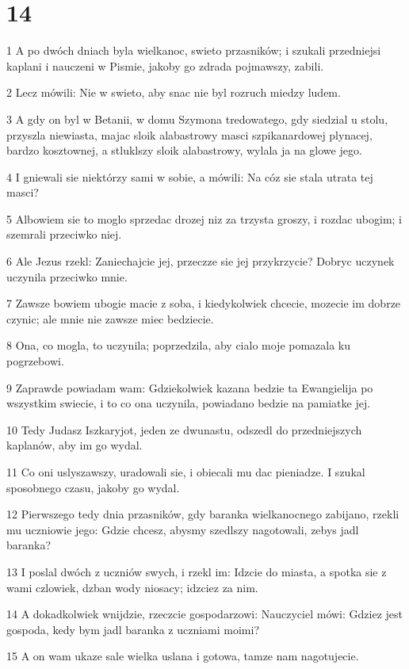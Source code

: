 \chapter{14}

\par 1 A po dwóch dniach byla wielkanoc, swieto przasników; i szukali przedniejsi kaplani i nauczeni w Pismie, jakoby go zdrada pojmawszy, zabili.
\par 2 Lecz mówili: Nie w swieto, aby snac nie byl rozruch miedzy ludem.
\par 3 A gdy on byl w Betanii, w domu Szymona tredowatego, gdy siedzial u stolu, przyszla niewiasta, majac sloik alabastrowy masci szpikanardowej plynacej, bardzo kosztownej, a stluklszy sloik alabastrowy, wylala ja na glowe jego.
\par 4 I gniewali sie niektórzy sami w sobie, a mówili: Na cóz sie stala utrata tej masci?
\par 5 Albowiem sie to moglo sprzedac drozej niz za trzysta groszy, i rozdac ubogim; i szemrali przeciwko niej.
\par 6 Ale Jezus rzekl: Zaniechajcie jej, przeczze sie jej przykrzycie? Dobryc uczynek uczynila przeciwko mnie.
\par 7 Zawsze bowiem ubogie macie z soba, i kiedykolwiek chcecie, mozecie im dobrze czynic; ale mnie nie zawsze miec bedziecie.
\par 8 Ona, co mogla, to uczynila; poprzedzila, aby cialo moje pomazala ku pogrzebowi.
\par 9 Zaprawde powiadam wam: Gdziekolwiek kazana bedzie ta Ewangielija po wszystkim swiecie, i to co ona uczynila, powiadano bedzie na pamiatke jej.
\par 10 Tedy Judasz Iszkaryjot, jeden ze dwunastu, odszedl do przedniejszych kaplanów, aby im go wydal.
\par 11 Co oni uslyszawszy, uradowali sie, i obiecali mu dac pieniadze. I szukal sposobnego czasu, jakoby go wydal.
\par 12 Pierwszego tedy dnia przasników, gdy baranka wielkanocnego zabijano, rzekli mu uczniowie jego: Gdzie chcesz, abysmy szedlszy nagotowali, zebys jadl baranka?
\par 13 I poslal dwóch z uczniów swych, i rzekl im: Idzcie do miasta, a spotka sie z wami czlowiek, dzban wody niosacy; idzciez za nim.
\par 14 A dokadkolwiek wnijdzie, rzeczcie gospodarzowi: Nauczyciel mówi: Gdziez jest gospoda, kedy bym jadl baranka z uczniami moimi?
\par 15 A on wam ukaze sale wielka uslana i gotowa, tamze nam nagotujecie.
